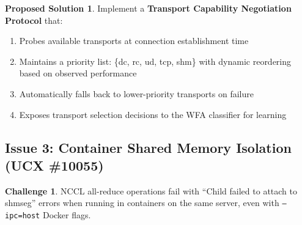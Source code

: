 \documentclass[11pt,letterpaper]{article}
\theoremstyle{definition}
\newtheorem{challenge}{Challenge}
\newtheorem{solution}{Proposed Solution}
\begin{document}
\begin{solution}
Implement a \textbf{Transport Capability Negotiation Protocol} that:
\begin{enumerate}
    \item Probes available transports at connection establishment time
    \item Maintains a priority list: \{dc, rc, ud, tcp, shm\} with dynamic reordering based on observed performance
    \item Automatically falls back to lower-priority transports on failure
    \item Exposes transport selection decisions to the WFA classifier for learning
\end{enumerate}
\end{solution}

\subsection{Issue 3: Container Shared Memory Isolation (UCX \#10055)}

\begin{challenge}
NCCL all-reduce operations fail with ``Child failed to attach to shmseg'' errors when running in containers on the same server, even with \texttt{--ipc=host} Docker flags.
\end{challenge}
\end{document}
